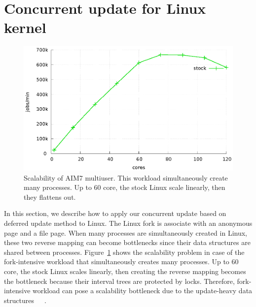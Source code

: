 \section{Concurrent update for Linux kernel}


\begin{figure}[tb]
  \begin{center}
    \includegraphics[scale=0.65]{graph/aim7_default.eps}
  \end{center}
  \caption{Scalability of AIM7 multiuser. This workload simultaneously create
  many processes.
  Up to 60 core, the stock Linux scale linearly, then they flattens out.}
  \label{fig:aim7_default}
\end{figure}
 
In this section, we describe how to apply our concurrent update based on
deferred update method to Linux.
The Linux fork is associate with an anonymous page and a file page.
When many processes are simultaneously created in Linux, 
these two reverse mapping
can become bottlenecks since their data structures are shared between
processes.
Figure~\ref{fig:aim7_default} shows the scalability problem in case
of the fork-intensive workload that simultaneously creates many processes.
Up to 60 core, the stock Linux scales linearly, then creating the reverse
mapping becomes the bottleneck because their interval trees are protected by
locks.
Therefore, fork-intensive workload can pose a scalability bottleneck due to the
update-heavy data
structures~\cite{SilasBoydWickizerPth}~\cite{Andi2011adding}~\cite{Tim2013adding}.

